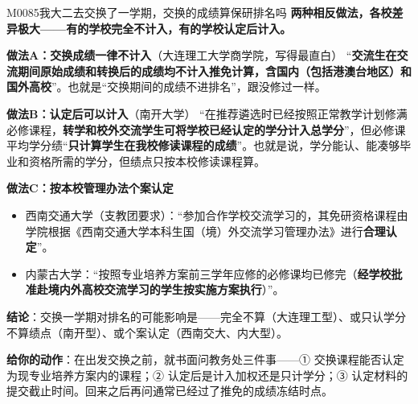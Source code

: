 \begin{qa}{M0085}{我大二去交换了一学期，交换的成绩算保研排名吗}
\textbf{两种相反做法，各校差异极大——有的学校完全不计入，有的学校认定后计入。}

\textbf{做法A：交换成绩一律不计入}（大连理工大学商学院，写得最直白）
“\textbf{交流生在交流期间原始成绩和转换后的成绩均不计入推免计算，含国内（包括港澳台地区）和国外高校}”。也就是“交换期间的成绩不进排名”，跟没修过一样。

\textbf{做法B：认定后可以计入}（南开大学）
“在推荐遴选时已经按照正常教学计划修满必修课程，\textbf{转学和校外交流学生可将学校已经认定的学分计入总学分}”，但必修课平均学分绩“\textbf{只计算学生在我校修读课程的成绩}”。也就是说，学分能认、能凑够毕业和资格所需的学分，但绩点只按本校修读课程算。

\textbf{做法C：按本校管理办法个案认定}
\begin{itemize}
  \item 西南交通大学（支教团要求）：“参加合作学校交流学习的，其免研资格课程由学院根据《西南交通大学本科生国（境）外交流学习管理办法》进行\textbf{合理认定}”。
  \item 内蒙古大学：“按照专业培养方案前三学年应修的必修课均已修完（\textbf{经学校批准赴境内外高校交流学习的学生按实施方案执行}）”。
\end{itemize}

\textbf{结论}：交换一学期对排名的可能影响是——完全不算（大连理工型）、或只认学分不算绩点（南开型）、或个案认定（西南交大、内大型）。

\textbf{给你的动作}：在出发交换之前，就书面问教务处三件事——① 交换课程能否认定为现专业培养方案内的课程；② 认定后是计入加权还是只计学分；③ 认定材料的提交截止时间。回来之后再问通常已经过了推免的成绩冻结时点。
\end{qa}

